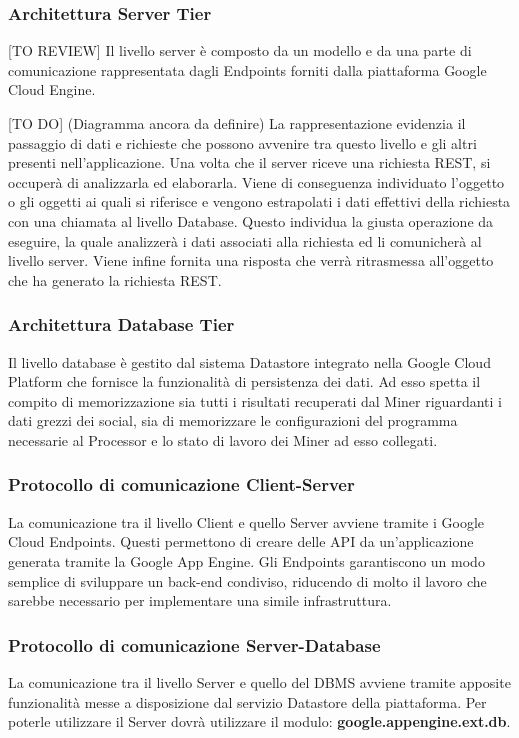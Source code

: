 		\subsubsection{Architettura Server Tier}
		[TO REVIEW] Il livello server è composto da un modello e da una parte di comunicazione rappresentata dagli Endpoints forniti dalla piattaforma Google Cloud Engine. \newline \newline

		[TO DO] (Diagramma ancora da definire) \newline \newline
		[TO REVIEW] \newline
		La rappresentazione evidenzia il passaggio di dati e richieste che possono avvenire tra questo livello e gli altri presenti nell'applicazione.
		Una volta che il server riceve una richiesta REST, si occuperà di analizzarla ed elaborarla. Viene di conseguenza individuato l’oggetto o gli oggetti ai quali si riferisce e vengono estrapolati i dati effettivi della richiesta con una chiamata al livello Database. Questo individua la giusta operazione da eseguire, la quale analizzerà i dati associati alla richiesta ed li comunicherà al livello server. Viene infine fornita una risposta che verrà ritrasmessa all'oggetto che ha generato la richiesta REST.

		\subsubsection{Architettura Database Tier}
		Il livello database è gestito dal sistema Datastore integrato nella Google Cloud Platform che fornisce la funzionalità di persistenza dei dati. Ad esso spetta il compito di memorizzazione sia tutti i risultati recuperati dal Miner riguardanti i dati grezzi dei social, sia di memorizzare le configurazioni del programma necessarie al Processor e lo stato di lavoro dei Miner ad esso collegati.

		\subsubsection{Protocollo di comunicazione Client-Server}
		La comunicazione tra il livello Client e quello Server avviene tramite i Google Cloud Endpoints. Questi permettono di creare delle API da un'applicazione generata tramite la Google App Engine. Gli Endpoints garantiscono un modo semplice di sviluppare un back-end condiviso, riducendo di molto il lavoro che sarebbe necessario per implementare una simile infrastruttura. 


		\subsubsection{Protocollo di comunicazione Server-Database}
		La comunicazione tra il livello Server e quello del DBMS avviene tramite apposite funzionalità messe a disposizione dal servizio Datastore della piattaforma. Per poterle utilizzare il Server dovrà utilizzare il modulo: \textbf{google.appengine.ext.db}.


